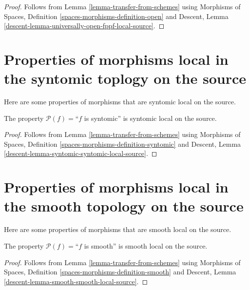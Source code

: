 \begin{proof}
Follows from
Lemma \ref{lemma-transfer-from-schemes}
using
Morphisms of Spaces, Definition \ref{spaces-morphisms-definition-open}
and
Descent, Lemma \ref{descent-lemma-universally-open-fppf-local-source}.
\end{proof}



\section{Properties of morphisms local in the syntomic toplogy on the source}
\label{section-syntomic-local-source}

\noindent
Here are some properties of morphisms that are syntomic local on the source.

\begin{lemma}
\label{lemma-syntomic-syntomic-local-source}
The property $\mathcal{P}(f)=$``$f$ is syntomic''
is syntomic local on the source.
\end{lemma}

\begin{proof}
Follows from
Lemma \ref{lemma-transfer-from-schemes}
using
Morphisms of Spaces, Definition \ref{spaces-morphisms-definition-syntomic}
and
Descent, Lemma \ref{descent-lemma-syntomic-syntomic-local-source}.
\end{proof}




\section{Properties of morphisms local in the smooth topology on the source}
\label{section-smooth-local-source}

\noindent
Here are some properties of morphisms that are smooth local on the source.

\begin{lemma}
\label{lemma-smooth-smooth-local-source}
The property $\mathcal{P}(f)=$``$f$ is smooth''
is smooth local on the source.
\end{lemma}

\begin{proof}
Follows from
Lemma \ref{lemma-transfer-from-schemes}
using
Morphisms of Spaces, Definition \ref{spaces-morphisms-definition-smooth}
and
Descent, Lemma \ref{descent-lemma-smooth-smooth-local-source}.
\end{proof}



